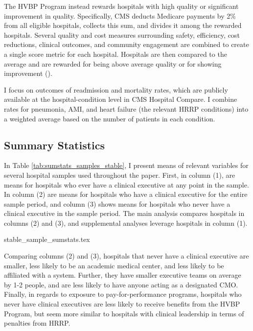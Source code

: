 \documentclass[12pt]{article}
\begin{document}
    The HVBP Program instead rewards hospitals with high quality or significant improvement in quality. Specifically, CMS deducts Medicare payments by 2\% from all eligible hospitals, collects this sum, and divides it among the rewarded hospitals. Several quality and cost measures surrounding safety, efficiency, cost reductions, clinical outcomes, and community engagement are combined to create a single score metric for each hospital. Hospitals are then compared to the average and are rewarded for being above average quality or for showing improvement (\cite{CMS_2023}). 

    I focus on outcomes of readmission and mortality rates, which are publicly available at the hospital-condition level in CMS Hospital Compare. I combine rates for pneumonia, AMI, and heart failure (the relevant HRRP conditions) into a weighted average based on the number of patients in each condition. 

	\subsection{Summary Statistics}\label{sec:data}

    In Table \ref{tab:sumstats_samples_stable}, I present means of relevant variables for several hospital samples used throughout the paper. First, in column (1), are means for hospitals who ever have a clinical executive at any point in the sample. In column (2) are means for hospitals who have a clinical executive for the entire sample period, and column (3) shows means for hospitals who never have a clinical executive in the sample period. The main analysis compares hospitals in columns (2) and (3), and supplemental analyses leverage hospitals in column (1). 

    {stable_sample_sumstats.tex}

    Comparing columns (2) and (3), hospitals that never have a clinical executive are smaller, less likely to be an academic medical center, and less likely to be affiliated with a system. Further, they have smaller executive teams on average by 1-2 people, and are less likely to have anyone acting as a designated CMO. Finally, in regards to exposure to pay-for-performance programs, hospitals who never have clinical executives are less likely to receive benefits from the HVBP Program, but seem more similar to hospitals with clinical leadership in terms of penalties from HRRP. 
\end{document}

